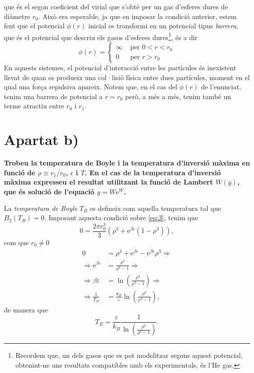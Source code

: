 \documentclass[a4paper, 10pt]{article}
\begin{document}
que és el segon coeficient del virial que s'obté per un gas d'esferes dures de diàmetre $r_0$. Això era esperable, ja que en imposar la condició anterior, estem fent que el potencial $\phi(r)$ inicial es transformi en un potencial tipus \textit{barrera}, que és el potencial que descriu els gasos d'esferes dures\footnote{Recordem que, un dels gasos que es pot modelitzar segons aquest potencial, obtenint-ne uns resultats compatibles amb els experimentals, és l'He gas.}, és a dir
\begin{equation}
	\phi(r) =
	\begin{cases}
		\infty & \text{ per } 0 < r < r_0 \\
		0 & \text{ per } r > r_0
	\end{cases}
\end{equation}
En aquests sistemes, el potencial d'interacció entre les partícules és inexistent llevat de quan es produeix una col·lisió física entre dues partícules, moment en el qual una força repulsiva apareix. Notem que, en el cas del $\phi(r)$ de l'enunciat, tenim una barrera de potencial a $r = r_0$ però, a més a més, tenim també un terme atractiu entre $r_0$ i $r_1$.
\section*{\textbf{Apartat b)}}

\textbf{Trobeu la temperatura de Boyle i la temperatura d'inversió màxima en funció de $\rho \equiv r_1/r_0$, $\epsilon$ i $T$. En el cas de la temperatura d'inversió màxima expresseu el resultat utilitzant la funció de Lambert $W(y)$, que és solució de l'equació $y = W\mathrm{e}^W$.}

La \textit{temperatura de Boyle} $T_B$ es defineix com aquella temperatura tal que $B_2(T_B) = 0$. Imposant aquesta condició sobre \eqref{eq:3}, tenim que
\begin{equation}
	0 = \frac{2\pi r_0^3}{3}(\rho^3+\mathrm{e}^{\beta\epsilon}(1-\rho^3)),
\end{equation}
com que $r_0 \neq 0$
\begin{align*}
	0 & = \rho^3+\mathrm{e}^{\beta \epsilon}-\mathrm{e}^{\beta \epsilon}\rho^3 \Rightarrow \\
	\Rightarrow \mathrm{e}^{\beta\varepsilon} & = \frac{\rho^3}{\rho^3-1} \Rightarrow \\
	\Rightarrow \beta\varepsilon & = \ln \left(\frac{\rho^3}{\rho^3-1}\right) \Rightarrow \\
	\Rightarrow \frac{1}{T_B} & = \frac{k_B}{\varepsilon}\ln \left(\frac{\rho^3}{\rho^3-1}\right),
\end{align*}
de manera que
\begin{equation}
	\boxed{T_B = \frac{\varepsilon}{k_B}\frac{1}{\ln\left(\frac{\rho^3}{\rho^3-1}\right)}}.
\label{eq:7}
\end{equation}
\end{document}
